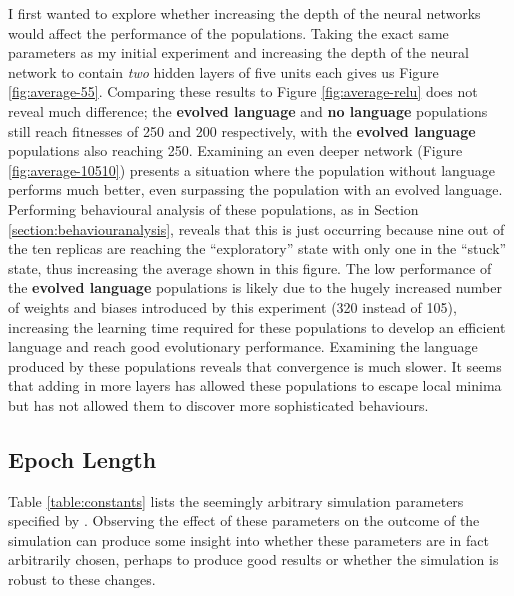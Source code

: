 \documentclass[12pt,a4paper,twoside,openright]{report}
\begin{document}
I first wanted to explore whether increasing the depth of the neural networks would affect the performance of the populations. Taking the exact same parameters as my initial experiment and increasing the depth of the neural network to contain \emph{two} hidden layers of five units each gives us Figure \ref{fig:average-55}. Comparing these results to Figure \ref{fig:average-relu} does not reveal much difference; the {\bf evolved language} and {\bf no language} populations still reach fitnesses of 250 and 200 respectively, with the {\bf evolved language} populations also reaching 250. Examining an even deeper network (Figure \ref{fig:average-10510}) presents a situation where the population without language performs much better, even surpassing the population with an evolved language. Performing behavioural analysis of these populations, as in Section \ref{section:behaviouranalysis}, reveals that this is just occurring because nine out of the ten replicas are reaching the ``exploratory'' state with only one in the ``stuck'' state, thus increasing the average shown in this figure. The low performance of the {\bf evolved language} populations is likely due to the hugely increased number of weights and biases introduced by this experiment (320 instead of 105), increasing the learning time required for these populations to develop an efficient language and reach good evolutionary performance. Examining the language produced by these populations reveals that convergence is much slower. It seems that adding in more layers has allowed these populations to escape local minima but has not allowed them to discover more sophisticated behaviours.

\subsection{Epoch Length}

Table \ref{table:constants} lists the seemingly arbitrary simulation parameters specified by \citet{Cangelosi1998}. Observing the effect of these parameters on the outcome of the simulation can produce some insight into whether these parameters are in fact arbitrarily chosen, perhaps to produce good results or whether the simulation is robust to these changes.
\end{document}
